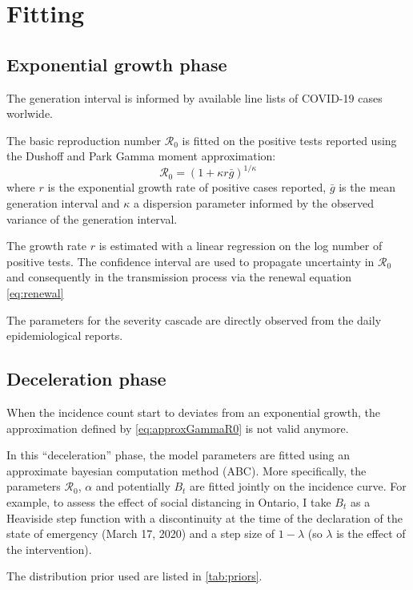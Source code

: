\documentclass[12pt]{article}
\newcommand{\Ro}{\mathcal{R}_0}
\begin{document}
\section{Fitting}

\subsection{Exponential growth phase}

The generation interval is informed by available line lists of COVID-19 cases worlwide. 

The basic reproduction number $\Ro$ is fitted on the positive tests reported using the Dushoff and Park Gamma moment approximation:
\begin{equation}
\Ro = (1 + \kappa r \bar g) ^{1/\kappa}
\label{eq:approxGammaR0}
\end{equation}
where $r$ is the exponential growth rate of positive cases reported, $\bar  g$ is the mean generation interval and $\kappa$ a dispersion parameter informed by the observed variance of the generation interval.

The growth rate $r$ is estimated with a linear regression on the log number of positive tests. The confidence interval are used to propagate uncertainty in $\Ro$ and consequently in the transmission process via the renewal equation \autoref{eq:renewal}


The parameters for the severity cascade are directly observed from the daily epidemiological reports.

\subsection{Deceleration phase}

When the incidence count start to deviates from an exponential growth, the approximation defined by \autoref{eq:approxGammaR0} is not valid anymore. 

In this ``deceleration'' phase, the model parameters are fitted using an approximate bayesian computation method (ABC). More specifically, the parameters $\Ro$, $\alpha$ and potentially $B_t$ are fitted jointly on the incidence curve. 
For example, to assess the effect of social distancing in Ontario, I take $B_t$ as a Heaviside step function with a discontinuity at the time of the declaration of the state of emergency (March 17, 2020) and a step size of $1-\lambda$ (so $\lambda$ is the effect of the intervention).

The distribution prior used are listed in \autoref{tab:priors}.
\end{document}
